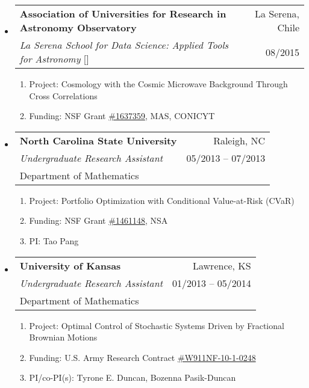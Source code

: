\documentclass[letterpaper,10pt]{extarticle}
\makeatletter
\newcommand{\myhref}[3][blue]{\href{#2}{\color{#1}{#3}}}
\newcommand{\subheadingtwolines}[4]{
\begin{tabular*}{6.55in}{l@{\cftdotfill{\cftsecdotsep}\extracolsep{\fill}}r}
#1 & #2 \\
#3 & #4 \\
\end{tabular*}}
\newcommand{\subheadingthreelines}[6]{
\begin{tabular*}{6.55in}{l@{\cftdotfill{\cftsecdotsep}\extracolsep{\fill}}r}
#1 & #2 \\
#3 & #4 \\
#5 & #6 \\
\end{tabular*}}
\makeatother
\begin{document}
\begin{itemize}[leftmargin=0.4cm, itemsep=0.5cm]
\item[] \hspace{-2ex}\subheadingtwolines{\bf Association of Universities for Research in Astronomy Observatory}{La Serena, Chile}{{\it La Serena School for Data Science: Applied Tools for Astronomy} [\myhref{http://lssds.aura-astronomy.org/winter_school/}{Link}]}{08/2015}

\begin{enumerate}[leftmargin=0.3cm, itemsep=-0.05ex]
	\item[] Project: Cosmology with the Cosmic Microwave Background Through Cross Correlations
	\item[] Funding: NSF Grant \href{https://www.nsf.gov/awardsearch/showAward?AWD_ID=1637359&HistoricalAwards=false}{\#1637359}, MAS, CONICYT
\end{enumerate}


\item[] \hspace{-2ex}\subheadingthreelines{\bf North Carolina State University}{Raleigh, NC}{\it Undergraduate Research Assistant}{05/2013 -- 07/2013}{Department of Mathematics}{}

\begin{enumerate}[leftmargin=0.3cm, itemsep=-0.05ex]
	\item[] Project: Portfolio Optimization with Conditional Value-at-Risk (CVaR)
	\item[] Funding: NSF Grant \href{https://www.nsf.gov/awardsearch/showAward?AWD_ID=1461148&HistoricalAwards=false}{\#1461148}, NSA
	\item[] PI: Tao Pang
\end{enumerate}


\item[] \hspace{-2ex}\subheadingthreelines{\bf University of Kansas}{Lawrence, KS}{\it Undergraduate Research Assistant}{01/2013 -- 05/2014}{Department of Mathematics}{}

\begin{enumerate}[leftmargin=0.3cm, itemsep=-0.05ex]
	\item[] Project: Optimal Control of Stochastic Systems Driven by Fractional Brownian Motions
	\item[] Funding: U.S. Army Research Contract \href{https://apps.dtic.mil/sti/pdfs/ADA614716.pdf}{\#W911NF-10-1-0248}
	\item[] PI/co-PI(s): Tyrone E. Duncan, Bozenna Pasik-Duncan
\end{enumerate}



\end{itemize}
\end{document}
